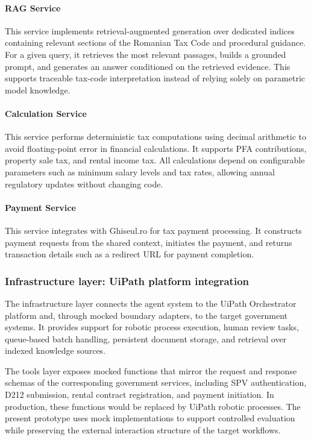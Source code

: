 \documentclass[3p,times,procedia]{elsarticle}
\begin{document}
\paragraph{RAG Service}
This service implements retrieval-augmented generation over dedicated indices containing relevant sections of the Romanian Tax Code and procedural guidance. For a given query, it retrieves the most relevant passages, builds a grounded prompt, and generates an answer conditioned on the retrieved evidence. This supports traceable tax-code interpretation instead of relying solely on parametric model knowledge.

\paragraph{Calculation Service}
This service performs deterministic tax computations using decimal arithmetic to avoid floating-point error in financial calculations. It supports PFA contributions, property sale tax, and rental income tax. All calculations depend on configurable parameters such as minimum salary levels and tax rates, allowing annual regulatory updates without changing code.

\paragraph{Payment Service}
This service integrates with Ghiseul.ro for tax payment processing. It constructs payment requests from the shared context, initiates the payment, and returns transaction details such as a redirect URL for payment completion.

\subsubsection{Infrastructure layer: UiPath platform integration}
\label{subsubsec:infrastructure}

The infrastructure layer connects the agent system to the UiPath Orchestrator platform and, through mocked boundary adapters, to the target government systems. It provides support for robotic process execution, human review tasks, queue-based batch handling, persistent document storage, and retrieval over indexed knowledge sources.

The tools layer exposes mocked functions that mirror the request and response schemas of the corresponding government services, including SPV authentication, D212 submission, rental contract registration, and payment initiation. In production, these functions would be replaced by UiPath robotic processes. The present prototype uses mock implementations to support controlled evaluation while preserving the external interaction structure of the target workflows.
\end{document}
